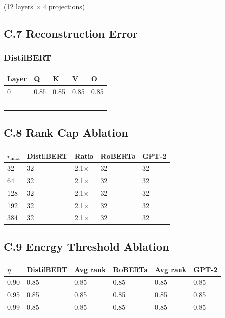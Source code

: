 (12 layers $\times$ 4 projections)

\subsection{C.7 Reconstruction Error}

\subsubsection{DistilBERT}
\begin{table}[H]
\centering
\small
\begin{tabular}{lllll}
\toprule
\textbf{Layer} & \textbf{Q} & \textbf{K} & \textbf{V} & \textbf{O} \\
\midrule
0 & 0.85 & 0.85 & 0.85 & 0.85 \\
... & ... & ... & ... & ... \\
\bottomrule
\end{tabular}
\end{table}

\subsection{C.8 Rank Cap Ablation}

\begin{table}[H]
\centering
\small
\begin{tabular}{lllll}
\toprule
\textbf{$r_\text{max}$} & \textbf{DistilBERT} & \textbf{Ratio} & \textbf{RoBERTa} & \textbf{GPT-2} \\
\midrule
32 & 32 & 2.1$\times$ & 32 & 32 \\
64 & 32 & 2.1$\times$ & 32 & 32 \\
128 & 32 & 2.1$\times$ & 32 & 32 \\
192 & 32 & 2.1$\times$ & 32 & 32 \\
384 & 32 & 2.1$\times$ & 32 & 32 \\
\bottomrule
\end{tabular}
\end{table}

\subsection{C.9 Energy Threshold Ablation}

\begin{table}[H]
\centering
\small
\begin{tabular}{llllll}
\toprule
\textbf{$\eta$} & \textbf{DistilBERT} & \textbf{Avg rank} & \textbf{RoBERTa} & \textbf{Avg rank} & \textbf{GPT-2} \\
\midrule
0.90 & 0.85 & 0.85 & 0.85 & 0.85 & 0.85 \\
0.95 & 0.85 & 0.85 & 0.85 & 0.85 & 0.85 \\
0.99 & 0.85 & 0.85 & 0.85 & 0.85 & 0.85 \\
\bottomrule
\end{tabular}
\end{table}

